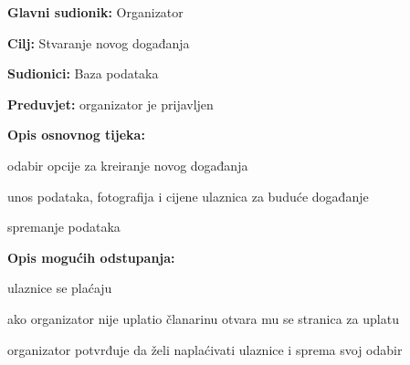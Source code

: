 					\noindent {}
					\begin{packed_item}
	
						\item \textbf{Glavni sudionik: }Organizator 
						\item  \textbf{Cilj:} Stvaranje novog događanja
						\item  \textbf{Sudionici:} Baza podataka
						\item  \textbf{Preduvjet:} organizator je prijavljen
						\item  \textbf{Opis osnovnog tijeka:}
						
						\item[] \begin{packed_enum}
	
							\item odabir opcije za kreiranje novog događanja
							\item unos podataka, fotografija i cijene ulaznica za buduće događanje
							\item spremanje podataka
						\end{packed_enum}
						
						\item  \textbf{Opis mogućih odstupanja:}
						
						\item[] \begin{packed_item}
	
							\item[2.a] ulaznice se plaćaju
							\item[] \begin{packed_enum}
								
								\item ako organizator nije uplatio članarinu otvara mu se stranica za uplatu
								\item organizator potvrđuje da želi naplaćivati ulaznice i sprema svoj odabir
								
							\end{packed_enum}
							
							
						\end{packed_item}
					\end{packed_item}
					
